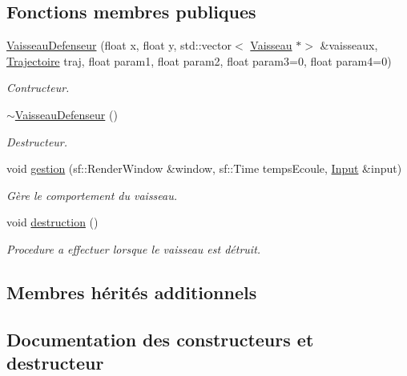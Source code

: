 \subsection*{Fonctions membres publiques}
\begin{DoxyCompactItemize}
\item 
\hyperlink{class_vaisseau_defenseur_aab85dfe4f9839ce6c3bdfafcefb62fbf}{Vaisseau\+Defenseur} (float x, float y, std\+::vector$<$ \hyperlink{class_vaisseau}{Vaisseau} $\ast$$>$ \&vaisseaux, \hyperlink{_trajectoire_8h_afa7f6e8323d7ee755d93cd1f6019dd95}{Trajectoire} traj, float param1, float param2, float param3=0, float param4=0)
\begin{DoxyCompactList}\small\item\em Contructeur. \end{DoxyCompactList}\item 
\hyperlink{class_vaisseau_defenseur_afb1098f176694c537f9a6c31da42d165}{$\sim$\+Vaisseau\+Defenseur} ()
\begin{DoxyCompactList}\small\item\em Destructeur. \end{DoxyCompactList}\item 
void \hyperlink{class_vaisseau_defenseur_adb26b3df0bb5888548ff897f23e2ec82}{gestion} (sf\+::\+Render\+Window \&window, sf\+::\+Time temps\+Ecoule, \hyperlink{_input_8h_a5588d60d674991c719a8df848313e966}{Input} \&input)
\begin{DoxyCompactList}\small\item\em Gère le comportement du vaisseau. \end{DoxyCompactList}\item 
void \hyperlink{class_vaisseau_defenseur_a6816d325d737269cddc6310e7f68b222}{destruction} ()
\begin{DoxyCompactList}\small\item\em Procedure a effectuer lorsque le vaisseau est détruit. \end{DoxyCompactList}\end{DoxyCompactItemize}
\subsection*{Membres hérités additionnels}


\subsection{Documentation des constructeurs et destructeur}
\mbox{\label{class_vaisseau_defenseur_aab85dfe4f9839ce6c3bdfafcefb62fbf}} 
